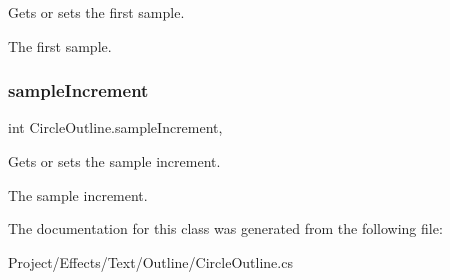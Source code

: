 Gets or sets the first sample. 

The first sample.\mbox{\label{class_circle_outline_a3b50a97b874f55d06e09c2a96e3ca121}} 
\subsubsection{\texorpdfstring{sample\+Increment}{sampleIncrement}}
{\footnotesize\ttfamily int Circle\+Outline.\+sample\+Increment\hspace{0.3cm}{\ttfamily [get]}, {\ttfamily [set]}}



Gets or sets the sample increment. 

The sample increment.

The documentation for this class was generated from the following file\+:\begin{DoxyCompactItemize}
\item 
Project/\+Effects/\+Text/\+Outline/Circle\+Outline.\+cs\end{DoxyCompactItemize}
